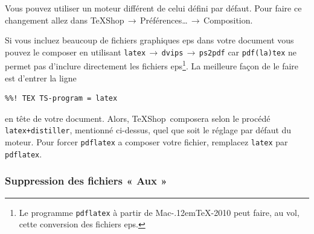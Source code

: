 \documentclass[11pt,french]{article}
\newcommand{\MacTeX}{Mac\kern-.12em\TeX}
\newcommand{\TS}{\textsf{\TeX Shop}}
\newcommand{\acr}[1]{\textsf{#1}}
\newcommand{\cmd}[1]{\textsf{#1}}
\newcommand{\mnu}[1]{\textsf{#1}}
\newcommand{\To}{\,\(\to\)\,}
\begin{document}
Vous pouvez utiliser un moteur différent de celui défini par défaut. Pour faire ce changement allez dans \mnu{TeXShop}\To\mnu{Préférences…}\To\mnu{Composition}.

Si vous incluez beaucoup de fichiers graphiques \acr{eps} dans votre document vous pouvez le composer en utilisant \texttt{latex}\To\texttt{dvips}\To\texttt{ps2pdf} car \texttt{pdf(la)tex} ne permet pas d'inclure directement les fichiers \acr{eps}\footnote{Le programme \texttt{pdflatex} à partir de \MacTeX-2010 peut faire, au vol, cette conversion des fichiers \acr{eps}.}. La meilleure façon de le faire est d'entrer la ligne
\begin{verbatim}
%%! TEX TS-program = latex
\end{verbatim}
en tête de votre document. Alors, \TS\ composera selon le procédé \texttt{latex+distiller}, mentionné ci-dessus, quel que soit le réglage par défaut du moteur. Pour forcer \texttt{pdflatex} a composer votre fichier, remplacez \texttt{latex} par \texttt{pdflatex}.

%
%

\subsubsection{Suppression des fichiers « \cmd{Aux} »}
\end{document}
